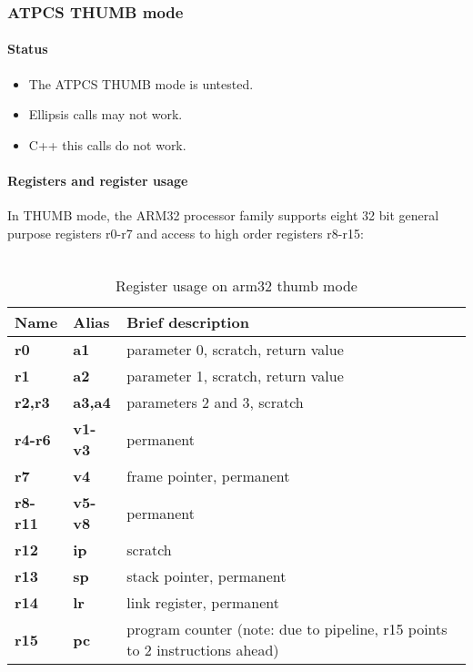 \clearpage


\subsubsection{ATPCS THUMB mode}


\paragraph{Status}

\begin{itemize}
\item The ATPCS THUMB mode is untested.
\item Ellipsis calls may not work.
\item C++ this calls do not work.
\end{itemize}

\paragraph{Registers and register usage}

In THUMB mode, the ARM32 processor family supports eight 32 bit general purpose registers r0-r7 and access to high order registers r8-r15:\\
\\
\begin{table}[h]
\begin{tabular*}{0.95\textwidth}{lll}
Name         & Alias       & Brief description\\
\hline
{\bf r0}     & {\bf a1}    & parameter 0, scratch, return value\\
{\bf r1}     & {\bf a2}    & parameter 1, scratch, return value\\
{\bf r2,r3}  & {\bf a3,a4} & parameters 2 and 3, scratch\\
{\bf r4-r6}  & {\bf v1-v3} & permanent\\
{\bf r7}     & {\bf v4}    & frame pointer, permanent\\
{\bf r8-r11} & {\bf v5-v8} & permanent\\
{\bf r12}    & {\bf ip}    & scratch\\
{\bf r13}    & {\bf sp}    & stack pointer, permanent\\
{\bf r14}    & {\bf lr}    & link register, permanent\\
{\bf r15}    & {\bf pc}    & program counter (note: due to pipeline, r15 points to 2 instructions ahead)\\
\end{tabular*}
\caption{Register usage on arm32 thumb mode}
\end{table}

